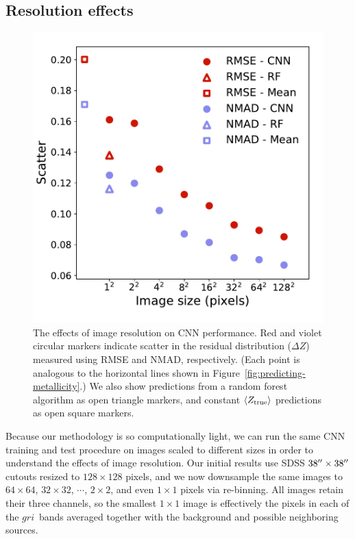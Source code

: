 \documentclass[fleqn,usenatbib]{mnras}
\newcommand{\sdssg}{\hbox{$g$}}
\newcommand{\sdssr}{\hbox{$r$}}
\newcommand{\sdssi}{\hbox{$i$}}
\begin{document}
\subsection{Resolution effects} \label{sec:resolution}

\begin{figure}
	\includegraphics[width=\columnwidth]{04-resolution.pdf}
	\caption{\label{fig:resolution}
		The effects of image resolution on CNN performance. Red and violet circular markers indicate scatter in the residual distribution ($\Delta Z$) measured using RMSE and NMAD, respectively. (Each point is analogous to the horizontal lines shown in Figure~\ref{fig:predicting-metallicity}.) We also show predictions from a random forest algorithm as open triangle markers, and constant $\langle Z_{\rm true}\rangle$ predictions as open square markers.}
\end{figure}

Because our methodology is so computationally light, we can run the same CNN training and test procedure on images scaled to different sizes in order to understand the effects of image resolution. Our initial results use SDSS $38\hbox{$^{\prime\prime}$} \times 38 \hbox{$^{\prime\prime}$}$ cutouts resized to $128\times 128$ pixels, and we now downsample the same images to $64\times 64$, $32 \times 32$, $\cdots$, $2\times 2$, and even $1\times 1$ pixels via re-binning. All images retain their three channels, so the smallest $1 \times 1$ image is effectively the pixels in each of the \sdssg\sdssr\sdssi\ bands averaged together with the background and possible neighboring sources.
\end{document}
